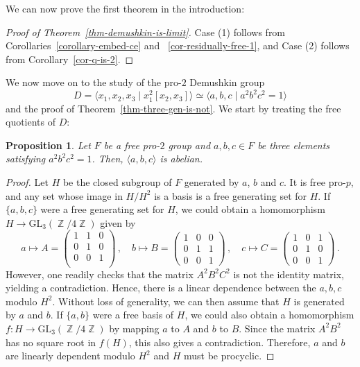 \documentclass[a4paper]{amsart}
\DeclareMathOperator{\bbz}{\mathbb{Z}}
\newtheorem{prop}[thm]{Proposition}
\theoremstyle{definition}
\begin{document}
We can now prove the first theorem in the introduction:

\begin{proof}[Proof of Theorem~\ref{thm-demushkin-is-limit}] Case (1) follows from Corollaries~\ref{corollary-embed-ce} and ~\ref{cor-residually-free-1}, and Case (2) follows from Corollary~\ref{cor-q-is-2}.
\end{proof}

We now move on to the study of the pro-\(2\) Demushkin group \[D = \langle x_1,x_2,x_3\mid x_1^2[x_2,x_3]\rangle \simeq \langle a,b,c\mid a^2b^2c^2 = 1\rangle\] and the proof of Theorem~\ref{thm-three-gen-is-not}. We start by treating the free quotients of \(D\):

\begin{prop}\label{prop-lyndon} Let \(F\) be a free pro-\(2\) group and \(a,b,c \in F\) be three elements satisfying \(a^2b^2c^2 = 1\). Then, \(\langle a,b,c\rangle\) is abelian.
\end{prop}
\begin{proof} Let \(H\) be the closed subgroup of \(F\) generated by \(a\), \(b\) and \(c\). It is free pro-\(p\), and any set whose image in \(H/H^2\) is a basis is a free generating set for \(H\). If \(\{a,b,c\}\) were a free generating set for \(H\), we could obtain a homomorphism \(H \to \mathrm{GL}_3(\bbz/4\bbz)\) given by \[a \mapsto A = \begin{pmatrix}
    1 & 1 & 0\\
    0 & 1 & 0\\
    0 & 0 & 1\\
\end{pmatrix}\,,\quad b \mapsto B = \begin{pmatrix}
    1 & 0 & 0\\0 & 1 & 1\\
    0 & 0 & 1
\end{pmatrix}\,,\quad c \mapsto C = \begin{pmatrix}
    1 & 0 & 1\\0 & 1  & 0\\0 & 0 & 1
\end{pmatrix}\,.\] However, one readily checks that the matrix \(A^2B^2C^2\) is not the identity matrix, yielding a contradiction. Hence, there is a linear dependence between the \(a,b,c\) modulo \(H^2\). Without loss of generality, we can then assume that \(H\) is generated by \(a\) and \(b\). If \(\{a,b\}\) were a free basis of \(H\), we could also obtain a homomorphism \(f\colon H \to \mathrm{GL}_3(\bbz/4\bbz)\) by mapping \(a\) to \(A\) and \(b\) to \(B\). Since the matrix \(A^2B^2\) has no square root in \(f(H)\), this also gives a contradiction. Therefore, \(a\) and \(b\) are linearly dependent modulo \(H^2\) and \(H\) must be procyclic.
\end{proof}
\end{document}
